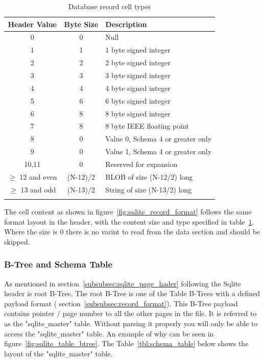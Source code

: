 \begin{longtable}[h]{| c | c| p{5cm} |}
		\hline
			\textbf{Header Value} & \textbf{Byte Size} & \textbf{Description} \\ 
		\hline
		\endhead
			0 & 0 & Null \\
		\hline
			1 & 1 & 1 byte signed integer \\
		\hline
			2 & 2 & 2 byte signed integer \\
		\hline
			3 & 3 & 3 byte signed integer \\
		\hline
			4 & 4 & 4 byte signed integer \\
		\hline
			5 & 6 & 6 byte signed integer \\
		\hline
			6 & 8 & 8 byte signed integer \\
		\hline
			7 & 8 & 8 byte IEEE floating point \\
		\hline
			8 & 0 & Value 0, Schema 4 or greater only \\
		\hline
			9 & 0 & Value 1, Schema 4 or greater only \\
		\hline
			10,11 & 0 & Reserved for expansion \\
		\hline
			$\geq$ 12 and even & (N-12)/2 & BLOB of size (N-12/2) long \\
		\hline
			$\geq$ 13 and odd & (N-13)/2 & String of size (N-13/2) long \\
		\hline
	\caption{Database record cell types}
	\label{tbl:cell_header_record_types}
\end{longtable}

The cell content as shown in figure~\ref{fig:sqlite_record_format} follows the same format layout in the header, with the content size and type specified in table~\ref{tbl:cell_header_record_types}. Where the size is 0 there is no varint to read from the data section and should be skipped.

\subsubsection{ B-Tree and Schema Table}
\label{subsubsec:schema_table}

As mentioned in section~\ref{subsubsec:sqlite_page_hader} following the Sqlite header is root B-Tree. The root B-Tree is one of the Table B-Trees with a defined payload format ( section~\ref{subsubsec:record_format}). This B-Tree payload contains pointer / page number to all the other pages in the file. It is referred to as the "sqlite\verb|_|master" table. Without parsing it properly you will only be able to access the "sqlite\verb|_|master" table. An example of why can be seen in figure~\ref{fig:sqlite_table_btree}. The Table~\ref{tbl:schema_table} below shows the layout of the "sqlite\verb|_|master" table.

